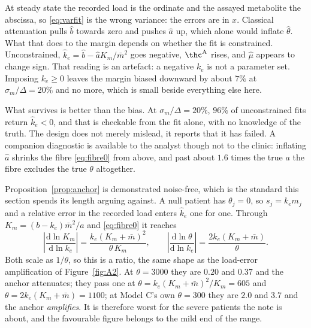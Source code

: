 \begin{remark}
\label{rem:eiv}
At steady state the recorded load is the ordinate and the assayed metabolite the abscissa,
so \eqref{eq:varfit} is the wrong variance: the errors are in $x$. Classical attenuation
pulls $\hat b$ towards zero and pushes $\hat a$ up, which alone would inflate $\hat\theta$.
What that does to the margin depends on whether the fit is constrained. Unconstrained,
$\hat k_e = \hat b - \hat a K_m/\bar m^2$ goes negative, $\thc^{\mathrm{A}}$ rises, and
$\hat\mu$ appears to change sign. That reading is an artefact: a negative $k_e$ is not a
parameter set. Imposing $k_e \ge 0$ leaves the margin biased downward by about $7\%$ at
$\sigma_m/\Delta = 20\%$ and no more, which is small beside everything else here.

What survives is better than the bias. At $\sigma_m/\Delta = 20\%$, $96\%$ of unconstrained
fits return $\hat k_e < 0$, and that is checkable from the fit alone, with no knowledge of
the truth. The design does not merely mislead, it reports that it has failed. A companion
diagnostic is available to the analyst though not to the clinic: inflating $\hat a$ shrinks
the fibre \eqref{eq:fibre0} from above, and past about $1.6$ times the true $a$ the fibre
excludes the true $\theta$ altogether.
\end{remark}

\begin{remark}
\label{rem:anchor_var}
Proposition~\ref{prop:anchor} is demonstrated noise-free, which is the standard this section
spends its length arguing against. A null patient has $\theta_j = 0$, so $s_j = k_e m_j$ and
a relative error in the recorded load enters $\hat k_e$ one for one. Through
$K_m = (b - k_e)\bar m^2/a$ and \eqref{eq:fibre0} it reaches
\begin{equation}
\left|\frac{\mathrm{d}\ln K_m}{\mathrm{d}\ln k_e}\right|
= \frac{k_e (K_m + \bar m)^2}{\theta\,K_m},
\qquad
\left|\frac{\mathrm{d}\ln \theta}{\mathrm{d}\ln k_e}\right|
= \frac{2 k_e (K_m + \bar m)}{\theta}.
\label{eq:anchorfac}
\end{equation}
Both scale as $1/\theta$, so this is a ratio, the same shape as the
load-error amplification of Figure~\ref{fig:A2}. At $\theta = 3000$ they are $0.20$ and
$0.37$ and the anchor attenuates; they pass one at $\theta = k_e(K_m+\bar m)^2/K_m = 605$
and $\theta = 2k_e(K_m+\bar m) = 1100$; at Model C's own $\theta = 300$ they are $2.0$ and
$3.7$ and the anchor \emph{amplifies}. It is therefore worst for the severe patients the
note is about, and the favourable figure belongs to the mild end of the range.
\end{remark}

